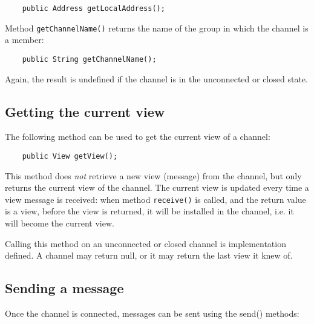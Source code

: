     \begin{small}
    \begin{verbatim}
    public Address getLocalAddress();
    \end{verbatim}
    \end{small}

    Method {\tt getChannelName()} returns the name of the group in which the channel
    is a member:

    \begin{small}
    \begin{verbatim}
    public String getChannelName();
    \end{verbatim}
    \end{small}

    Again, the result is undefined if the channel is in the unconnected or closed
    state.



    \subsection{Getting the current view}

    The following method can be used to get the current view of a channel:
	
    \begin{small}
    \begin{verbatim}
    public View getView();
    \end{verbatim}
    \end{small}

    This method does {\em not} retrieve a new view (message) from the channel, but
    only returns the current view of the channel. The current view is updated every
    time a view message is received: when method {\tt receive()} is called, and the
    return value is a view, before the view is returned, it will be installed in the
    channel, i.e. it will become the current view.

    Calling this method on an unconnected or closed channel is implementation
    defined. A channel may return null, or it may return the last view it knew of.




    \subsection{Sending a message}

    Once the channel is connected, messages can be sent using the send() methods:

